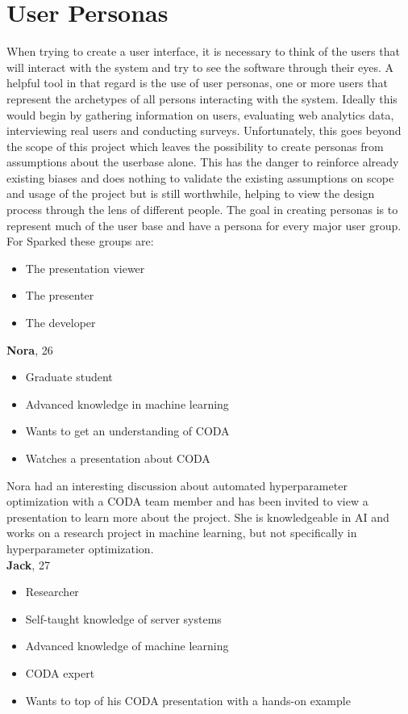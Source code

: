 \section{User Personas}
When trying to create a user interface, it is necessary to think of the users that will interact with the system and try to see the software through their eyes. A helpful tool in that regard is the use of user personas, one or more users that represent the archetypes of all persons interacting with the system. 
Ideally this would begin by gathering information on users, evaluating web analytics data, interviewing real users and conducting surveys. Unfortunately, this goes beyond the scope of this project which leaves the possibility to create personas from assumptions about the userbase alone. This has the danger to reinforce already existing biases and does nothing to validate the existing assumptions on scope and usage of the project but is still worthwhile, helping to view the design process through the lens of different people.
The goal in creating personas is to represent much of the user base and have a persona for every major user group. For Sparked these groups are:
\begin{itemize}
\item	The presentation viewer
\item The presenter
\item The developer
\end{itemize}

\noindent
\textbf{Nora}, 26
\begin{itemize}
\item	Graduate student
\item	Advanced knowledge in machine learning
\item	Wants to get an understanding of CODA
\item	Watches a presentation about CODA
\end{itemize}
Nora had an interesting discussion about automated hyperparameter optimization with a CODA team member and has been invited to view a presentation to learn more about the project. She is knowledgeable in AI and works on a research project in machine learning, but not specifically in hyperparameter optimization. \\

\noindent
\textbf{Jack}, 27
\begin{itemize}
\item	Researcher
\item	Self-taught knowledge of server systems 
\item	Advanced knowledge of machine learning
\item	CODA expert
\item	Wants to top of his CODA presentation with a hands-on example
\end{itemize}

